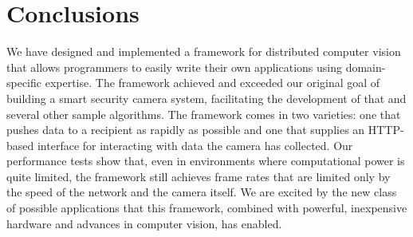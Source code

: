 \section{Conclusions}
\label{sec:conclusion}

We have designed and implemented a framework for distributed
computer vision that allows programmers to easily write their own
applications using domain-specific expertise.  The framework achieved
and exceeded our original goal of building a smart security camera system,
facilitating the development of that and several other sample algorithms.  The framework
comes in two varieties: one that pushes data to a recipient as rapidly as
possible and one that supplies an HTTP-based interface for interacting with
data the camera has collected.  Our performance tests show that, even
in environments where computational power is quite limited, the framework
still achieves frame rates that are limited only by the speed of the network and
the camera itself.  We are excited by the new class of possible
applications that this framework, combined with powerful, inexpensive
hardware and advances in computer vision, has enabled.